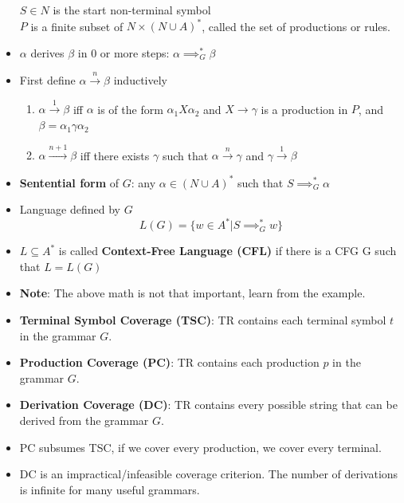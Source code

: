 \documentclass[a4paper]{article}
\begin{document}
\begin{itemize}
    $S\in N$ is the start non-terminal symbol\\
    $P$ is a finite subset of $N\times (N\cup A)^*$, called the set of productions or rules.
    \item $\alpha$ derives $\beta$ in $0$ or more steps: $\alpha\implies_G^*\beta$
    \item First define $\alpha \xrightarrow{n}\beta$ inductively
    \begin{enumerate}
        \item $\alpha \xrightarrow{1}\beta$ iff $\alpha$ is of the form $\alpha_1X\alpha_2$ and $X\to \gamma$ is a production in $P$, and $\beta=\alpha_1\gamma \alpha_2$
        \item $\alpha \xrightarrow{n+1}\beta$ iff there exists $\gamma$ such that $\alpha \xrightarrow{n}\gamma$ and $\gamma \xrightarrow{1}\beta$
    \end{enumerate}
    \item \textbf{Sentential form} of $G$: any $\alpha \in (N\cup A)^*$ such that $S\implies_G^*\alpha$
    \item Language defined by $G$
    \begin{equation*}
        L(G)=\{w\in A^*|S\implies_G^*w\}
    \end{equation*}
    \item $L\subseteq A^*$ is called \textbf{Context-Free Language (CFL)} if there is a CFG G such that $L=L(G)$
    \item \textbf{Note}: The above math is not that important, learn from the example.
    \item \textbf{Terminal Symbol Coverage (TSC)}: TR contains each terminal symbol $t$ in the grammar $G$.
    \item \textbf{Production Coverage (PC)}: TR contains each production $p$ in the grammar $G$.
    \item \textbf{Derivation Coverage (DC)}: TR contains every possible string that can be derived from the grammar $G$.
    \item PC subsumes TSC, if we cover every production, we cover every terminal.
    \item DC is an impractical/infeasible coverage criterion. The number of derivations is infinite for many useful grammars.
\end{itemize}
\end{document}
